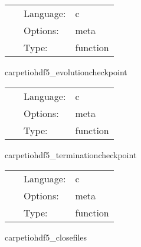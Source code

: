 \hspace{5mm}

 \begin{tabular*}{160mm}{cll} 
~ & Language:  & c \\ 
~ & Options:  & meta \\ 
~ & Type:  & function \\ 
\end{tabular*} 


\vspace{5mm}


\hspace{5mm} carpetiohdf5\_evolutioncheckpoint 

\hspace{5mm}{\it evolution checkpoint routine } 


\hspace{5mm}

 \begin{tabular*}{160mm}{cll} 
~ & Language:  & c \\ 
~ & Options:  & meta \\ 
~ & Type:  & function \\ 
\end{tabular*} 


\vspace{5mm}


\hspace{5mm} carpetiohdf5\_terminationcheckpoint 

\hspace{5mm}{\it termination checkpoint routine } 


\hspace{5mm}

 \begin{tabular*}{160mm}{cll} 
~ & Language:  & c \\ 
~ & Options:  & meta \\ 
~ & Type:  & function \\ 
\end{tabular*} 


\vspace{5mm}


\hspace{5mm} carpetiohdf5\_closefiles 

\hspace{5mm}{\it close all filereader input files } 


